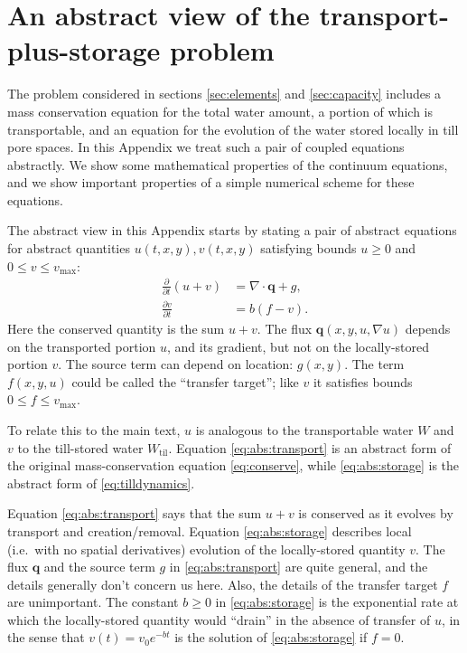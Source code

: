 \documentclass[11pt,final]{amsart}
\newcommand\bq{\mathbf{q}}
\newcommand{\Div}{\nabla\cdot}
\newcommand{\grad}{\nabla}
\newcommand{\Wtil}{W_{\text{til}}}
\begin{document}
\section{An abstract view of the transport-plus-storage problem} \label{app:transportstorage}

The problem considered in sections \ref{sec:elements} and \ref{sec:capacity} includes a mass conservation equation for the total water amount, a portion of which is transportable, and an equation for the evolution of the water stored locally in till pore spaces.  In this Appendix we treat such a pair of coupled equations abstractly.  We show some mathematical properties of the continuum equations, and we show important properties of a simple numerical scheme for these equations.

The abstract view in this Appendix starts by stating a pair of abstract equations for abstract quantities $u(t,x,y),v(t,x,y)$ satisfying bounds $u\ge 0$ and $0 \le v \le v_{\text{max}}$:
\begin{align}
\frac{\partial}{\partial t} \left(u+v\right) &= \Div \bq + g, \label{eq:abs:transport} \\
   \frac{\partial v}{\partial t} &= b \left(f - v\right).  \label{eq:abs:storage}
\end{align}
Here the conserved quantity is the sum $u+v$.  The flux $\bq(x,y,u,\grad u)$ depends on the transported portion $u$, and its gradient, but not on the locally-stored portion $v$.  The source term can depend on location: $g(x,y)$.  The term $f(x,y,u)$ could be called the ``transfer target''; like $v$ it satisfies bounds $0 \le f \le v_{\text{max}}$.

To relate this to the main text, $u$ is analogous to the transportable water $W$ and $v$ to the till-stored water $\Wtil$.  Equation \eqref{eq:abs:transport} is an abstract form of the original mass-conservation equation \eqref{eq:conserve}, while \eqref{eq:abs:storage} is the abstract form of \eqref{eq:tilldynamics}.

Equation \eqref{eq:abs:transport} says that the sum $u+v$ is conserved as it evolves by transport and creation/removal.  Equation \eqref{eq:abs:storage} describes local (i.e.~with no spatial derivatives) evolution of the locally-stored quantity $v$.  The flux $\bq$ and the source term $g$ in \eqref{eq:abs:transport} are quite general, and the details generally don't concern us here.  Also, the details of the transfer target $f$ are unimportant.  The constant $b\ge 0$ in \eqref{eq:abs:storage} is the exponential rate at which the locally-stored quantity would ``drain'' in the absence of transfer of $u$, in the sense that $v(t) = v_0 e^{-bt}$ is the solution of \eqref{eq:abs:storage} if $f=0$.
\end{document}
